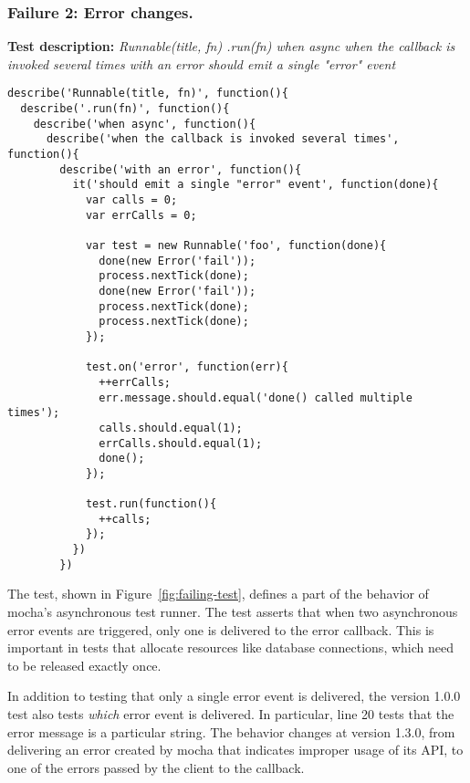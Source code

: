 \subsubsection{Failure 2: Error changes.}
\label{sec:failure2}
{\bf Test description: }
%
{\em Runnable(title, fn) .run(fn) when async when the callback is
  invoked several times with an error should emit a single "error"
  event }

\begin{figure*}
\begin{lstlisting}
describe('Runnable(title, fn)', function(){
  describe('.run(fn)', function(){
    describe('when async', function(){
      describe('when the callback is invoked several times', function(){
        describe('with an error', function(){
          it('should emit a single "error" event', function(done){
            var calls = 0;
            var errCalls = 0;

            var test = new Runnable('foo', function(done){
              done(new Error('fail'));
              process.nextTick(done);
              done(new Error('fail'));
              process.nextTick(done);
              process.nextTick(done);
            });

            test.on('error', function(err){
              ++errCalls;
              err.message.should.equal('done() called multiple times');
              calls.should.equal(1);
              errCalls.should.equal(1);
              done();
            });

            test.run(function(){
              ++calls;
            });
          })
        })
\end{lstlisting}
\caption{A failing mocha {\tt jsapi} test}
\label{fig:failing-test}
\end{figure*}

The test, shown in Figure~\ref{fig:failing-test}, defines a
part of the behavior of mocha's asynchronous test runner. The test 
asserts that when two asynchronous error events are triggered, only one
is delivered to the error callback. This is important in tests that
allocate resources like database connections, which need to be released
exactly once.

In addition to testing that only a single error event is delivered,
the version 1.0.0 test also tests {\em which} error event is
delivered. In particular, line 20 tests that the error message is a
particular string. The behavior changes at version 1.3.0, from
delivering an error created by mocha that indicates improper usage of
its API, to one of the errors passed by the client to the callback.

